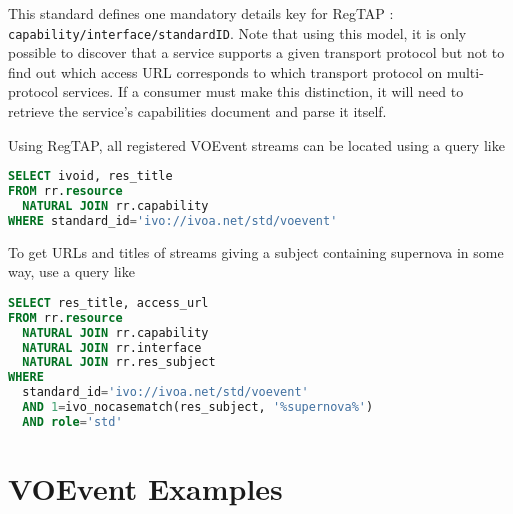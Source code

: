 \documentclass[11pt,a4paper]{ivoa}
\begin{document}
This standard defines one mandatory details key for RegTAP
\citep{2019ivoa.spec.1011D}: \verb|capability/interface/standardID|.
Note that using this model, it is only possible to discover that a
service supports a given transport protocol but not to find out which
access URL corresponds to which transport protocol on multi-protocol
services.  If a consumer must make this distinction, it will need to
retrieve the service's capabilities document and parse it itself.

Using RegTAP, all registered VOEvent streams
can be located using a query like

\begin{lstlisting}[language=SQL]
SELECT ivoid, res_title
FROM rr.resource
  NATURAL JOIN rr.capability
WHERE standard_id='ivo://ivoa.net/std/voevent'
\end{lstlisting}

To get URLs and titles of streams giving a subject containing supernova
in some way, use a query like

\begin{lstlisting}[language=SQL]
SELECT res_title, access_url
FROM rr.resource
  NATURAL JOIN rr.capability
  NATURAL JOIN rr.interface
  NATURAL JOIN rr.res_subject
WHERE
  standard_id='ivo://ivoa.net/std/voevent'
  AND 1=ivo_nocasematch(res_subject, '%supernova%')
  AND role='std'
\end{lstlisting}

\section{VOEvent Examples}
\label{sec:4}
\end{document}
